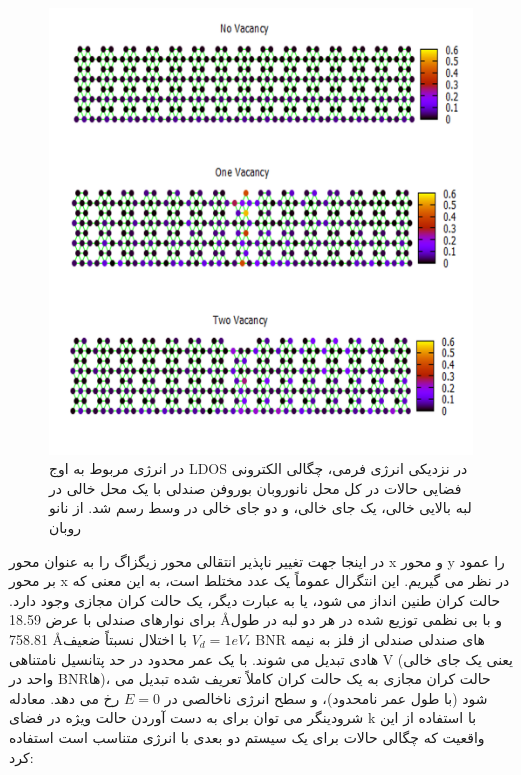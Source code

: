 \begin{figure}[!ht]
\centering
\includegraphics[width=1\linewidth]{./figures/Slide5.PNG}
\caption{در انرژی مربوط به اوج LDOS در نزدیکی انرژی فرمی، چگالی الکترونی فضایی حالات در کل محل نانوروبان بوروفن صندلی با یک محل خالی در لبه بالایی خالی، یک جای خالی، و دو جای خالی در وسط رسم شد. از نانو روبان}
\label{armVSLDOS}
\end{figure}
در اینجا جهت تغییر ناپذیر انتقالی محور زیگزاگ را به عنوان محور x و محور y را عمود بر محور x در نظر می گیریم. این انتگرال عموماً یک عدد مختلط است، به این معنی که حالت کران طنین انداز می شود، یا به عبارت دیگر، یک حالت کران مجازی وجود دارد. برای نوارهای صندلی با عرض 18.59 \AA و با بی نظمی توزیع شده در هر دو لبه در طول 758.81 \AA با اختلال نسبتاً ضعیف $V_d = 1 eV$، BNR های صندلی صندلی از فلز به نیمه هادی تبدیل می شوند. با یک عمر محدود در حد پتانسیل نامتناهی V (یعنی یک جای خالی واحد در BNRها)، حالت کران مجازی به یک حالت کران کاملاً تعریف شده تبدیل می شود (با طول عمر نامحدود)، و سطح انرژی ناخالصی در $E = 0$ رخ می دهد. معادله شرودینگر می توان برای به دست آوردن حالت ویژه در فضای k با استفاده از این واقعیت که چگالی حالات برای یک سیستم دو بعدی با انرژی متناسب است استفاده کرد:
